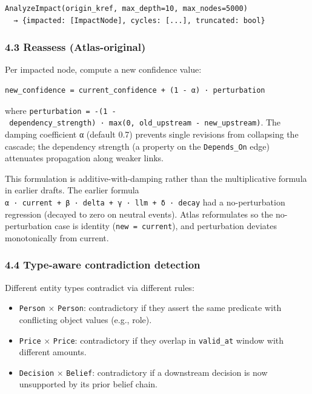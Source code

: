 \documentclass[
  11pt,
]{article}
\providecommand{\tightlist}{%
  \setlength{\itemsep}{0pt}\setlength{\parskip}{0pt}}
\begin{document}
\begin{verbatim}
AnalyzeImpact(origin_kref, max_depth=10, max_nodes=5000)
  → {impacted: [ImpactNode], cycles: [...], truncated: bool}
\end{verbatim}

\subsubsection{4.3 Reassess
(Atlas-original)}\label{reassess-atlas-original}

Per impacted node, compute a new confidence value:

\begin{verbatim}
new_confidence = current_confidence + (1 - α) · perturbation
\end{verbatim}

where
\texttt{perturbation\ =\ -(1\ -\ dependency\_strength)\ ·\ max(0,\ old\_upstream\ -\ new\_upstream)}.
The damping coefficient α (default 0.7) prevents single revisions from
collapsing the cascade; the dependency strength (a property on the
\texttt{Depends\_On} edge) attenuates propagation along weaker links.

This formulation is additive-with-damping rather than the multiplicative
formula in earlier drafts. The earlier formula
\texttt{α\ ·\ current\ +\ β\ ·\ delta\ +\ γ\ ·\ llm\ +\ δ\ ·\ decay} had
a no-perturbation regression (decayed to zero on neutral events). Atlas
reformulates so the no-perturbation case is identity
(\texttt{new\ =\ current}), and perturbation deviates monotonically from
current.

\subsubsection{4.4 Type-aware contradiction
detection}\label{type-aware-contradiction-detection}

Different entity types contradict via different rules:

\begin{itemize}
\tightlist
\item
  \texttt{Person} × \texttt{Person}: contradictory if they assert the
  same predicate with conflicting object values (e.g., role).
\item
  \texttt{Price} × \texttt{Price}: contradictory if they overlap in
  \texttt{valid\_at} window with different amounts.
\item
  \texttt{Decision} × \texttt{Belief}: contradictory if a downstream
  decision is now unsupported by its prior belief chain.
\end{itemize}
\end{document}
